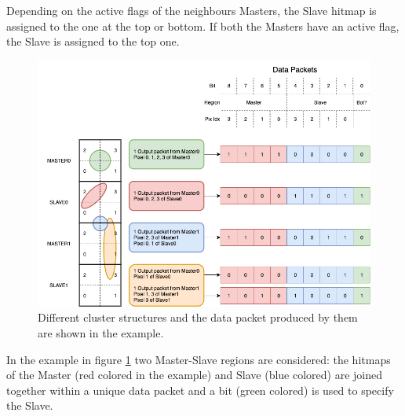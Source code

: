         Depending on the active flags of the neighbours Masters, the Slave hitmap is assigned to the one at the top or bottom. 
        If both the Masters have an active flag, the Slave is assigned to the top one. 
        \begin{figure}[h!]
            \centering
            \includegraphics[width=.95\linewidth]{figures/ARCADIA/clustering.png}
            \caption{Different cluster structures and the data packet produced by them are shown in the example.}
            \label{fig:clustering}
        \end{figure}
        In the example in figure \ref{fig:clustering} two Master-Slave regions are considered: the hitmaps of the Master (red colored in the example) and Slave (blue colored) are joined together within a unique data packet and a bit (green colored) is used to specify the Slave. 

